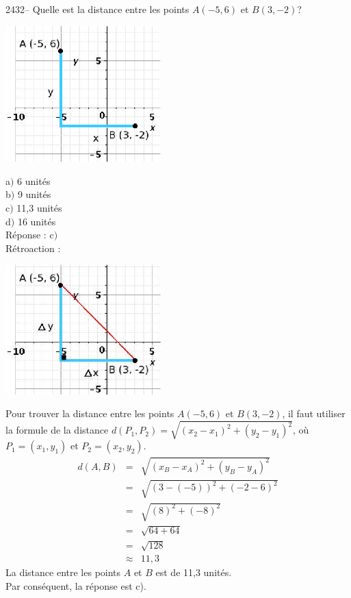 \documentclass[letterpaper, 12pt]{article}
\begin{document}
2432-- Quelle est la distance entre les points $A(-5, 6)$ et $B(3, -2)$?\\
\begin{center}
 \includegraphics[width=6cm,bb=14 14 320 280]{Q2432q.eps}
\end{center}

a$)$  6 unit\'es\\
b$)$  9 unit\'es\\
c$)$  11,3 unit\'es\\
d$)$  16 unit\'es\\

R\'eponse : c$)$ \\

R\'etroaction :\\
\begin{center}
 \includegraphics[width=6cm,bb=14 14 321 268]{Q2432r.eps}
\end{center}
Pour trouver la distance entre les points $A(-5, 6)$ et $B(3, -2)$, il faut utiliser la formule de la distance $d(P_{1}, P_{2})=\sqrt{(x_{2}-x_{1})^{2}+(y_{2}-y_{1})^{2}}$, o\`u $P_{1}=(x_{1},y_{1})$ et $P_{2}=(x_{2},y_{2})$.
\begin{eqnarray*}
 d(A, B)&=&\sqrt{(x_{B}-x_{A})^{2}+(y_{B}-y_{A})^{2}}\\
&=&\sqrt{(3-(-5))^{2}+(-2-6)^{2}}\\
&=&\sqrt{(8)^{2}+(-8)^{2}}\\
&=&\sqrt{64+64}\\
&=&\sqrt{128}\\
&\approx&11,3
\end{eqnarray*}
La distance entre les points $A$ et $B$ est de 11,3 unit\'es.\\
Par cons\'equent, la r\'eponse est c).\\
\end{document}
